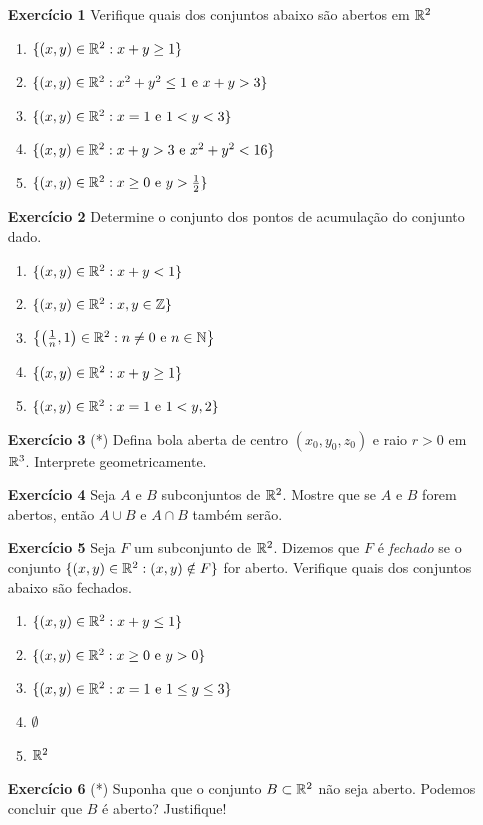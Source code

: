 \begin{enumerate}
    \item[\textbf{Exercício 1}] Verifique quais dos conjuntos abaixo são abertos em \(\mathbb{R}^2\)
        \begin{enumerate}
            \item \(\{(x,y)\in\mathbb{R}^2 : x+ y\geq 1\}\)
            \item \(\{(x,y)\in\mathbb{R}^2 : x^2 + y^2 \leq 1 \text{ e } x+y > 3\}\)
            \item \(\{(x,y)\in\mathbb{R}^2 : x= 1 \text{ e } 1 < y < 3\}\)
            \item \(\{(x,y)\in\mathbb{R}^2 : x + y > 3 \text{ e } x^2 + y^2 < 16\}\)
            \item \(\{(x,y)\in\mathbb{R}^2 : x\geq 0 \text{ e } y > \frac{1}{2}\}\)
        \end{enumerate}

    \item[\textbf{Exercício 2}]  Determine o conjunto dos pontos de acumulação do conjunto dado.
        \begin{enumerate}
            \item \(\{(x,y)\in\mathbb{R}^2 : x+ y < 1\}\)
            \item \(\{(x,y)\in\mathbb{R}^2 : x,y\in\mathbb{Z}\}\)
            \item \(\left\{\left(\frac{1}{n},1\right)\in\mathbb{R}^2 : n\neq 0 \text{ e } n\in\mathbb{N} \right\}\)
            \item \(\{(x,y)\in\mathbb{R}^2 : x + y \geq 1\}\)
            \item \(\{(x,y)\in\mathbb{R}^2 : x = 1 \text{ e } 1 < y , 2\}\)
        \end{enumerate}

    \item[\textbf{Exercício 3}] (*) Defina bola aberta de centro \((x_0,y_0,z_0)\) e raio \(r>0\) em \(\mathbb{R}^3\). Interprete geometricamente.
    \item[\textbf{Exercício 4}] Seja \(A\) e \(B\) subconjuntos de \(\mathbb{R}^2\). Mostre que se \(A\) e \(B\) forem abertos, então \(A\cup B\) e \(A\cap B\) também serão.
    \item[\textbf{Exercício 5}] Seja \(F\) um subconjunto de \(\mathbb{R}^2\). Dizemos que \(F\) é \textit{fechado} se o conjunto \(\{(x,y)\in\mathbb{R}^2 : (x,y)\notin F\}\) for aberto. Verifique quais dos conjuntos abaixo são fechados.
        \begin{enumerate}
            \item \(\{(x,y)\in\mathbb{R}^2 : x+ y \leq 1\}\)
            \item \(\{(x,y)\in\mathbb{R}^2 : x\geq 0 \text{ e } y>0\}\)
            \item \(\{(x,y)\in\mathbb{R}^2 : x = 1 \text{ e } 1\leq y \leq 3\}\)
            \item \(\emptyset\)
            \item \(\mathbb{R}^2\)
        \end{enumerate}
    \item[\textbf{Exercício 6}] (*) Suponha que o conjunto \(B\subset\mathbb{R}^2\) não seja aberto. Podemos concluir que \(B\) é aberto? Justifique!
\end{enumerate}